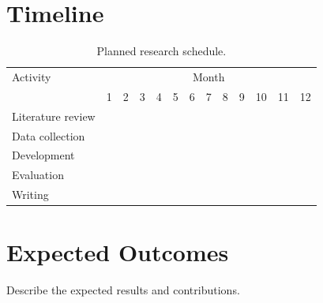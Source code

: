 \documentclass[12pt,a4paper]{article}
\newcommand{\on}{\cellcolor{bar}}
\begin{document}
\section{Timeline}
\begin{table}[h]
\centering
\setlength{\tabcolsep}{4pt}
\begin{tabular}{l*{12}{c}}
\toprule
Activity & \multicolumn{12}{c}{Month} \\
 & 1 & 2 & 3 & 4 & 5 & 6 & 7 & 8 & 9 & 10 & 11 & 12 \\
\midrule
Literature review & \on & \on & \on &  &  &  &  &  &  &  &  &  \\
Data collection &  &  & \on & \on & \on &  &  &  &  &  &  &  \\
Development &  &  &  &  & \on & \on & \on & \on &  &  &  &  \\
Evaluation &  &  &  &  &  &  &  & \on & \on & \on &  &  \\
Writing &  &  &  &  &  &  &  &  &  & \on & \on & \on \\
\bottomrule
\end{tabular}
\caption{Planned research schedule.}
\end{table}

\section{Expected Outcomes}
Describe the expected results and contributions.



\end{document}

